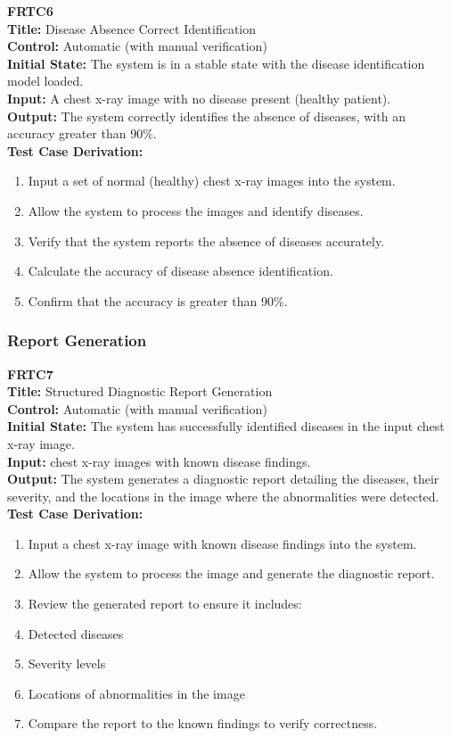 \documentclass[12pt, titlepage]{article}
\begin{document}
\textbf{FRTC6}\\
\textbf{Title:} Disease Absence Correct Identification\\
\textbf{Control:} Automatic (with manual verification)\\
\textbf{Initial State:} The system is in a stable state with the disease identification model loaded.\\
\textbf{Input:} A chest x-ray image with no disease present (healthy patient).\\
\textbf{Output:} The system correctly identifies the absence of diseases, with an accuracy greater than 90\%.\\
\textbf{Test Case Derivation:}
\begin{enumerate}
  \item Input a set of normal (healthy) chest x-ray images into the system.
  \item Allow the system to process the images and identify diseases.
  \item Verify that the system reports the absence of diseases accurately.
  \item Calculate the accuracy of disease absence identification.
  \item Confirm that the accuracy is greater than 90\%.
\end{enumerate}
\vspace{1em}

\subsubsection{Report Generation}
\textbf{FRTC7}\\
\textbf{Title:} Structured Diagnostic Report Generation\\
\textbf{Control:} Automatic (with manual verification)\\
\textbf{Initial State:} The system has successfully identified diseases in the input chest x-ray image.\\
\textbf{Input:} chest x-ray images with known disease findings.\\
\textbf{Output:} The system generates a diagnostic report detailing the diseases, their severity, and the locations in the image where the abnormalities were detected.\\
\textbf{Test Case Derivation:}
\begin{enumerate}
  \item Input a chest x-ray image with known disease findings into the system.
  \item Allow the system to process the image and generate the diagnostic report.
  \item Review the generated report to ensure it includes:
  \item Detected diseases
  \item Severity levels
  \item Locations of abnormalities in the image
  \item Compare the report to the known findings to verify correctness.
\end{enumerate}
\vspace{1em}
\end{document}

